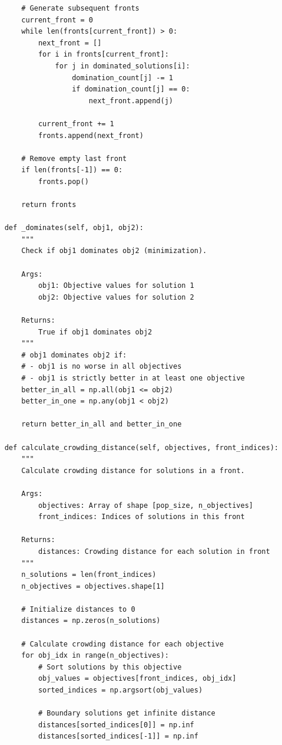 \begin{lstlisting}
        # Generate subsequent fronts
        current_front = 0
        while len(fronts[current_front]) > 0:
            next_front = []
            for i in fronts[current_front]:
                for j in dominated_solutions[i]:
                    domination_count[j] -= 1
                    if domination_count[j] == 0:
                        next_front.append(j)
            
            current_front += 1
            fronts.append(next_front)
        
        # Remove empty last front
        if len(fronts[-1]) == 0:
            fronts.pop()
        
        return fronts
    
    def _dominates(self, obj1, obj2):
        """
        Check if obj1 dominates obj2 (minimization).
        
        Args:
            obj1: Objective values for solution 1
            obj2: Objective values for solution 2
            
        Returns:
            True if obj1 dominates obj2
        """
        # obj1 dominates obj2 if:
        # - obj1 is no worse in all objectives
        # - obj1 is strictly better in at least one objective
        better_in_all = np.all(obj1 <= obj2)
        better_in_one = np.any(obj1 < obj2)
        
        return better_in_all and better_in_one
    
    def calculate_crowding_distance(self, objectives, front_indices):
        """
        Calculate crowding distance for solutions in a front.
        
        Args:
            objectives: Array of shape [pop_size, n_objectives]
            front_indices: Indices of solutions in this front
            
        Returns:
            distances: Crowding distance for each solution in front
        """
        n_solutions = len(front_indices)
        n_objectives = objectives.shape[1]
        
        # Initialize distances to 0
        distances = np.zeros(n_solutions)
        
        # Calculate crowding distance for each objective
        for obj_idx in range(n_objectives):
            # Sort solutions by this objective
            obj_values = objectives[front_indices, obj_idx]
            sorted_indices = np.argsort(obj_values)
            
            # Boundary solutions get infinite distance
            distances[sorted_indices[0]] = np.inf
            distances[sorted_indices[-1]] = np.inf
            

\end{lstlisting}
